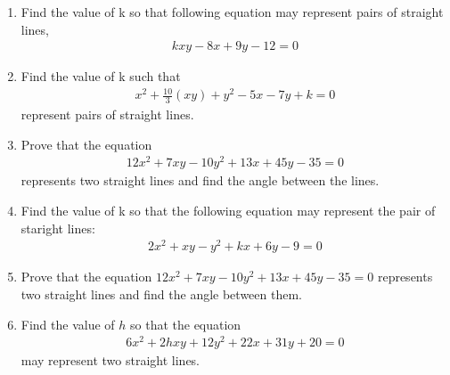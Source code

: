 \begin{enumerate}[label=\thesubsection.\arabic*.,ref=\thesubsection.\theenumi]
\item Find the value of k so that following equation may represent pairs of straight lines,
\begin{align}
kxy-8x+9y-12 = 0
\label{eq:solutions/13/10/Q_eq}
\end{align}
\solution


\item Find the value of k such that 
\begin{align}
x^{2}+ \frac{10}{3}(xy)+y^2 -5x -7y + k =0 \label{eq:solutions/13/11eq5}
\end{align}
 represent pairs of straight lines.
\\
\solution

\item Prove that the equation
\begin{align}
	12x^2 + 7xy -10y^2 +13x +45y -35 =0 
\end{align}
represents two straight lines and find the angle between the lines.
\\
\solution


\item Find the value of k so that the following equation may represent the pair of staright lines:
\begin{align}
	2x^2+ xy -y^2 + kx + 6y - 9 = 0 \label{eq:solutions/13/13/1} 
\end{align}

\solution

%
\item Prove that the equation $12x^2+7xy-10y^2+13x+45y-35=0$ represents two straight lines and find the angle between them. 
\\
\solution

\item Find the value of $h$ so that the equation 
\begin{align}
6x^2+2hxy+12y^2+22x+31y+20=0
\label{eq:solutions/13/ex2/question}
\end{align}
 may represent two straight lines.
\\
\solution


\end{enumerate}


